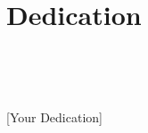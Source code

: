 \chapter*{Dedication}
\begin{center}
\
\
\
\
\
\
\
\
\par\vspace{20mm}
\
\
\
\
\
\

[Your Dedication]

\end{center}


